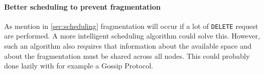 \documentclass[12pt,a4paper]{scrartcl}
\begin{document}
\paragraph{Better scheduling to prevent fragmentation}
As mention in \autoref{sec:scheduling} fragmentation will occur if a lot of \verb|DELETE| request are performed. A more intelligent scheduling algorithm could solve this. However, such an algorithm also requires that information about the available space and about the fragmentation must be shared across all nodes. This could probably done lazily with for example a Gossip Protocol.



\nocite{*}
\end{document}
